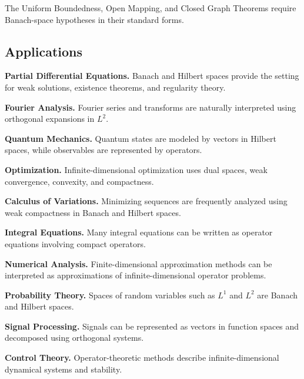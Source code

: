 The Uniform Boundedness, Open Mapping, and Closed Graph Theorems require
Banach-space hypotheses in their standard forms.

\subsection{Applications}
\label{subsec:functional-analysis-applications}

\begin{applicationbox}
\textbf{Partial Differential Equations.}
Banach and Hilbert spaces provide the setting for weak solutions,
existence theorems, and regularity theory.

\medskip

\textbf{Fourier Analysis.}
Fourier series and transforms are naturally interpreted using orthogonal
expansions in \(L^2\).

\medskip

\textbf{Quantum Mechanics.}
Quantum states are modeled by vectors in Hilbert spaces, while observables
are represented by operators.

\medskip

\textbf{Optimization.}
Infinite-dimensional optimization uses dual spaces, weak convergence,
convexity, and compactness.

\medskip

\textbf{Calculus of Variations.}
Minimizing sequences are frequently analyzed using weak compactness in
Banach and Hilbert spaces.

\medskip

\textbf{Integral Equations.}
Many integral equations can be written as operator equations involving
compact operators.

\medskip

\textbf{Numerical Analysis.}
Finite-dimensional approximation methods can be interpreted as
approximations of infinite-dimensional operator problems.

\medskip

\textbf{Probability Theory.}
Spaces of random variables such as \(L^1\) and \(L^2\) are Banach and
Hilbert spaces.

\medskip

\textbf{Signal Processing.}
Signals can be represented as vectors in function spaces and decomposed
using orthogonal systems.

\medskip

\textbf{Control Theory.}
Operator-theoretic methods describe infinite-dimensional dynamical
systems and stability.
\end{applicationbox}

